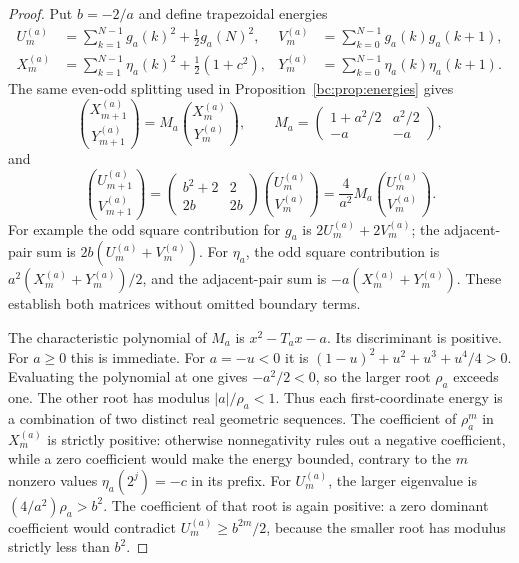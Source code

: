 \documentclass[11pt,a4paper,oneside,openany]{book}
\numberwithin{equation}{chapter}
\theoremstyle{definition}
\theoremstyle{remark}
\begin{document}
\begin{proof}
Put $b=-2/a$ and define trapezoidal energies
\begin{align*}
 U_m^{(a)}&=\sum_{k=1}^{N-1}g_a(k)^2+\tfrac12g_a(N)^2,&
 V_m^{(a)}&=\sum_{k=0}^{N-1}g_a(k)g_a(k+1),\\
 X_m^{(a)}&=\sum_{k=1}^{N-1}\eta_a(k)^2+\tfrac12(1+c^2),&
 Y_m^{(a)}&=\sum_{k=0}^{N-1}\eta_a(k)\eta_a(k+1).
\end{align*}
The same even-odd splitting used in Proposition~\ref{bc:prop:energies} gives
\begin{equation}
 \binom{X_{m+1}^{(a)}}{Y_{m+1}^{(a)}}=
 M_a\binom{X_m^{(a)}}{Y_m^{(a)}},\qquad
 M_a=\begin{pmatrix}1+a^2/2&a^2/2\\-a&-a\end{pmatrix},
 \label{bc:eq:param-energy}
\end{equation}
and
\begin{equation}
 \binom{U_{m+1}^{(a)}}{V_{m+1}^{(a)}}=
 \begin{pmatrix}b^2+2&2\\2b&2b\end{pmatrix}
 \binom{U_m^{(a)}}{V_m^{(a)}}
 =\frac4{a^2}M_a\binom{U_m^{(a)}}{V_m^{(a)}}.
 \label{bc:eq:param-genergy}
\end{equation}
For example the odd square contribution for $g_a$ is $2U_m^{(a)}+2V_m^{(a)}$;
the adjacent-pair sum is $2b(U_m^{(a)}+V_m^{(a)})$. For $\eta_a$, the odd square
contribution is $a^2(X_m^{(a)}+Y_m^{(a)})/2$, and the adjacent-pair sum is
$-a(X_m^{(a)}+Y_m^{(a)})$. These establish both matrices without omitted
boundary terms.

The characteristic polynomial of $M_a$ is $x^2-T_ax-a$. Its discriminant is
positive. For $a\ge0$ this is immediate. For $a=-u<0$ it is
$(1-u)^2+u^2+u^3+u^4/4>0$. Evaluating the polynomial at one gives $-a^2/2<0$,
so the larger root $\rho_a$ exceeds one. The other root has modulus
$|a|/\rho_a<1$. Thus each first-coordinate energy is a combination of two
distinct real geometric sequences. The coefficient of $\rho_a^m$ in
$X_m^{(a)}$ is strictly positive: otherwise nonnegativity rules out a negative
coefficient, while a zero coefficient would make the energy bounded, contrary
to the $m$ nonzero values $\eta_a(2^j)=-c$ in its prefix.
For $U_m^{(a)}$, the larger eigenvalue is $(4/a^2)\rho_a>b^2$. The coefficient
of that root is again positive: a zero dominant coefficient would contradict
$U_m^{(a)}\ge b^{2m}/2$, because the smaller root has modulus strictly less than
$b^2$.


\end{proof}
\end{document}
